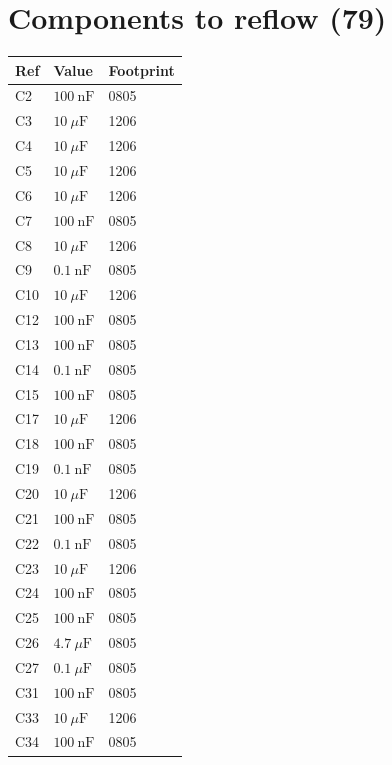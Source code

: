 \documentclass[10pt,letterpaper]{article}
\begin{document}
\section*{Components to reflow (79)}
\noindent \begin{tabular}[t]{@{}lll@{}}\toprule Ref & Value & Footprint\\\midrule
C2 & $100\:\text{n}\text{F}$ & 0805\\
C3 & $10\:\mu\text{F}$ & 1206\\
C4 & $10\:\mu\text{F}$ & 1206\\
C5 & $10\:\mu\text{F}$ & 1206\\
C6 & $10\:\mu\text{F}$ & 1206\\
C7 & $100\:\text{n}\text{F}$ & 0805\\
C8 & $10\:\mu\text{F}$ & 1206\\
C9 & $0.1\:\text{n}\text{F}$ & 0805\\
C10 & $10\:\mu\text{F}$ & 1206\\
C12 & $100\:\text{n}\text{F}$ & 0805\\
C13 & $100\:\text{n}\text{F}$ & 0805\\
C14 & $0.1\:\text{n}\text{F}$ & 0805\\
C15 & $100\:\text{n}\text{F}$ & 0805\\
C17 & $10\:\mu\text{F}$ & 1206\\
C18 & $100\:\text{n}\text{F}$ & 0805\\
C19 & $0.1\:\text{n}\text{F}$ & 0805\\
C20 & $10\:\mu\text{F}$ & 1206\\
C21 & $100\:\text{n}\text{F}$ & 0805\\
C22 & $0.1\:\text{n}\text{F}$ & 0805\\
C23 & $10\:\mu\text{F}$ & 1206\\
C24 & $100\:\text{n}\text{F}$ & 0805\\
C25 & $100\:\text{n}\text{F}$ & 0805\\
C26 & $4.7\:\mu\text{F}$ & 0805\\
C27 & $0.1\:\mu\text{F}$ & 0805\\
C31 & $100\:\text{n}\text{F}$ & 0805\\
C33 & $10\:\mu\text{F}$ & 1206\\
C34 & $100\:\text{n}\text{F}$ & 0805\\
\bottomrule\end{tabular}\hfill
\end{document}
